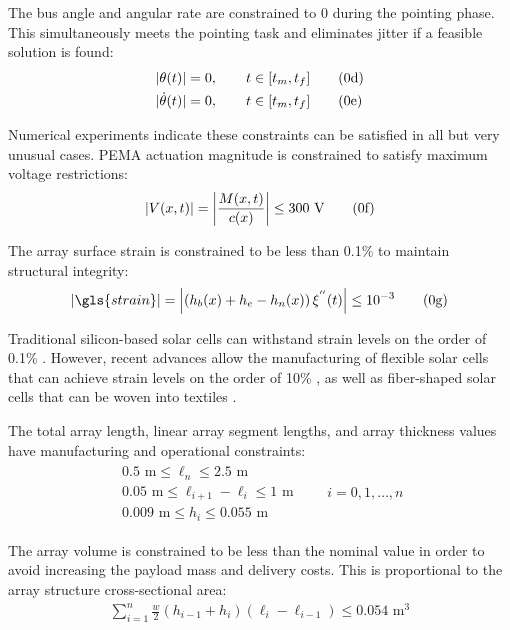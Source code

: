 \noindent The bus angle and angular rate are constrained to 0 during the pointing phase. This simultaneously meets the pointing task and eliminates jitter if a feasible solution is found:
\begin{align}
\abs{\theta(t)} &= 0, \qquad t \in [t_m,t_{f}] \tag{\theequation d} \label{eq:ch7:theta_path} \\
\abs{\dot{\theta}(t)} &= 0, \qquad t \in [t_m,t_{f}] \tag{\theequation e} \label{eq:ch7:dtheta_path}
\end{align}

\noindent Numerical experiments indicate these constraints can be satisfied in all but very unusual cases. PEMA actuation magnitude is constrained to satisfy maximum voltage restrictions:
\begin{align}
\abs{V(x,t)} = \abs*{\frac{M(x,t)}{c(x)}} \leq 300 \text{ V} \tag{\theequation f} \label{eq:ch7:voltage}
\end{align}

\noindent The array surface strain is constrained to be less than 0.1\% to maintain structural integrity:
\begin{align}
\abs{\gls{strain}} = \abs*{\left( h_{b}(x) + h_e - h_n(x) \right) \xi^{''}(t) } \leq 10^{-3} \tag{\theequation g} \label{eq:strain}
\end{align}

\noindent Traditional silicon-based solar cells can withstand strain levels on the order of 0.1\% \cite{Lindmayer1977a}. However, recent advances allow the manufacturing of flexible solar cells that can achieve strain levels on the order of 10\% \cite{Lee2011a}, as well as fiber-shaped solar cells that can be woven into textiles \cite{Qiu2016a}.

The total array length, linear array segment lengths, and array thickness values have manufacturing and operational constraints:
\begin{gather}
\begin{gathered}
0.5 \text{ m} \leq \ell_{n} \leq 2.5 \text{ m}  \\
0.05 \text{ m} \leq \ell_{i+1} - \ell_{i} \leq 1 \text{ m}  \\
0.009 \text{ m} \leq h_{i} \leq 0.055 \text{ m} 
\end{gathered} \qquad i = 0, 1, \dots, n \tag{\theequation h} \label{eq:geometrybounds}
\end{gather}

\noindent The array volume is constrained to be less than the nominal value in order to avoid increasing the payload mass and delivery costs. This is proportional to the array structure cross-sectional area:
\begin{align}
\sum_{i=1}^{n} \frac{w}{2}(h_{i-1}+h_{i})(\ell_{i}-\ell_{i-1}) \leq 0.054 \text{ m}^3 \tag{\theequation i} \label{eq:ch7:volume_con}
\end{align}

